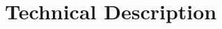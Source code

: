 \chapter{Technical Description} \label{ch:technical}

\ifpdf
    \graphicspath{{Chapter_technical/figures/PNG/}{Chapter_technical/figures/PDF/}{Chapter_technical/figures/}}
\else
    \graphicspath{{Chapter_technical/figures/EPS/}{Chapter_technical/figures/}}
\fi